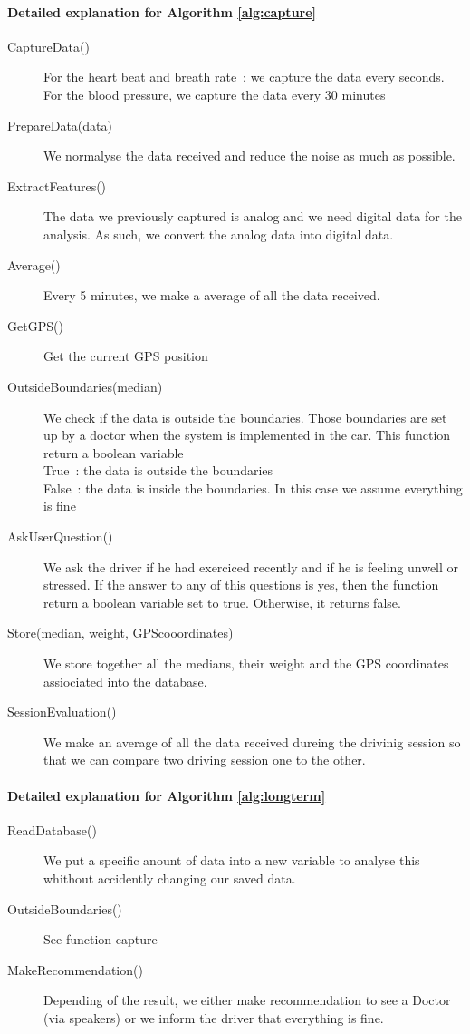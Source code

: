 \paragraph{Detailed explanation for Algorithm \ref{alg:capture}}
\begin{description}
	\item [CaptureData()] For the heart beat and breath rate : we capture the data every seconds. For the blood pressure, we capture the data every 30 minutes
	\item [PrepareData(data)] We normalyse the data received and reduce the noise as much as possible.
	\item [ExtractFeatures()] The data we previously captured is analog and we need digital data for the analysis. As such, we convert the analog data into digital data.
	\item [Average()] Every 5 minutes, we make a average of all the data received.
	\item [GetGPS()] Get the current GPS position
	\item [OutsideBoundaries(median)] We check if the data is outside the boundaries. Those boundaries are set up by a doctor when the system is implemented in the car. This function return a boolean variable\\
	True : the data is outside the boundaries\\
	False : the data is inside the boundaries. In this case we assume everything is fine
	\item [AskUserQuestion()] We ask the driver if he had exerciced recently and if he is feeling unwell or stressed. If the answer to any of this questions is yes, then the function return a boolean variable set to true. Otherwise, it returns false.
\item [Store(median, weight, GPScooordinates)] We store together all the medians, their weight and the GPS coordinates assiociated into the database.
\item [SessionEvaluation()] We make an average of all the data received dureing the drivinig session so that we can compare two driving session one to the other.
\end{description}
\paragraph{Detailed explanation for Algorithm \ref{alg:longterm}}
\begin{description}
	\item [ReadDatabase()] We put a specific anount of data into a new variable to analyse this whithout accidently changing our saved data.
	\item [OutsideBoundaries()] See function capture
	\item [MakeRecommendation()] Depending of the result, we either make recommendation to see a Doctor (via speakers) or we inform the driver that everything is fine.
\end{description}

